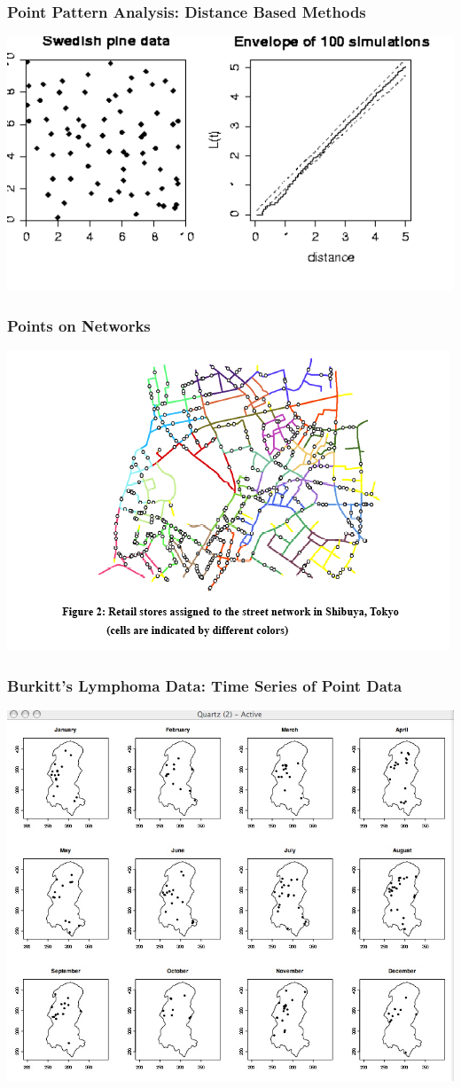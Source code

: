\documentclass[nototal]{beamer}
\begin{document}
     \begin{frame}
       \frametitle{Point Pattern Analysis: Distance Based Methods}
       \begin{center}
	 \includegraphics[width=.65\linewidth]{pinepoint.pdf}
       \end{center}
     \end{frame}

     \begin{frame}
       \frametitle{Points on Networks}
       \begin{center}
	 \includegraphics[width=.65\linewidth]{sanet.jpg}
       \end{center}
     \end{frame}

     \begin{frame}
       \frametitle{Burkitt's Lymphoma Data: Time Series of Point Data}
       \begin{center}
	 \includegraphics[width=.65\linewidth]{tspoints.jpg}
       \end{center}
     \end{frame}
\end{document}
